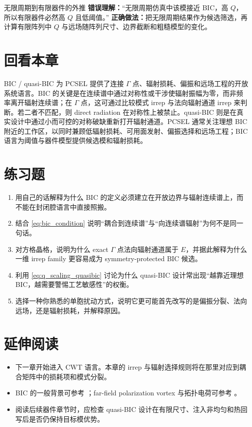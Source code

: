 \begin{CommonPitfallBox}{无限周期到有限器件的外推}
\textbf{错误理解：}“无限周期仿真中该模接近 BIC，高 $Q$，所以有限器件必然高 $Q$ 且低阈值。”
\textbf{正确做法：}把无限周期结果作为候选筛选，再计算有限阵列中 $Q$ 与远场随阵列尺寸、边界截断和粗糙模型的变化。
\end{CommonPitfallBox}

\section*{回看本章}
BIC / quasi-BIC 为 PCSEL 提供了连接 $\Gamma$ 点、辐射损耗、偏振和远场工程的开放系统语言。BIC 的关键是在连续谱中通过对称性或干涉使辐射振幅为零，而非频率离开辐射连续谱；在 $\Gamma$ 点，这可通过比较模式 irrep 与法向辐射通道 irrep 来判断。若二者不匹配，则 direct radiation 在对称性上被禁止。quasi-BIC 则是在真实设计中通过小而可控的对称破缺重新打开辐射通道。PCSEL 通常关注理想 BIC 附近的工作区，以同时兼顾低辐射损耗、可用面发射、偏振选择和远场工程；BIC 语言为阈值与器件模型提供候选模和辐射损耗。

\section*{练习题}
\begin{enumerate}
  \item \basicq 用自己的话解释为什么 BIC 的定义必须建立在开放边界与辐射连续谱上，而不能在封闭腔语言中直接照搬。

  \item \basicq 结合 \cref{eq:bic_condition} 说明“耦合到连续谱”与“向连续谱辐射”为何不是同一句话。

  \item \midq 对方格晶格，说明为什么 exact $\Gamma$ 点法向辐射通道属于 $E$，并据此解释为什么一维 irrep family 更容易成为 symmetry-protected BIC 候选。

  \item \midq 利用 \cref{eq:q_scaling_quasibic} 讨论为什么 quasi-BIC 设计常出现“越靠近理想 BIC，越需要警惕工艺敏感性”的权衡。

  \item \hardq 选择一种你熟悉的单胞扰动方式，说明它更可能首先改写的是偏振分裂、法向远场，还是辐射损耗，并解释原因。
\end{enumerate}

\section*{延伸阅读}
\begin{itemize}
  \item 下一章开始进入 CWT 语言。本章的 irrep 与辐射选择规则将在那里对应到耦合矩阵中的损耗项和模式分裂。

  \item BIC 的一般背景可参考 \cite{fan2002guided,hsu2013,hsu2016,kodigala2017}；far-field polarization vortex 与拓扑电荷可参考 \cite{zhen2014topological,yang2014bic}。

  \item 阅读后续器件章节时，应检查 quasi-BIC 设计在有限尺寸、注入非均匀和热回写后是否仍保持目标模优势。
\end{itemize}
